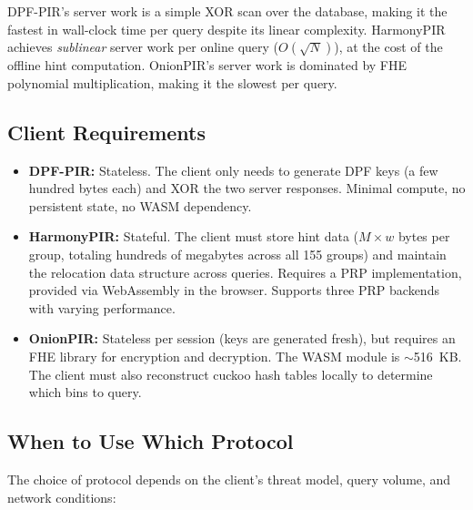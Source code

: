 DPF-PIR's server work is a simple XOR scan over the database, making it the fastest in wall-clock time per query despite its linear complexity. HarmonyPIR achieves \emph{sublinear} server work per online query ($O(\sqrt{N})$), at the cost of the offline hint computation. OnionPIR's server work is dominated by FHE polynomial multiplication, making it the slowest per query.

\subsection{Client Requirements}

\begin{itemize}[nolistsep,leftmargin=*]
    \item \textbf{DPF-PIR:} Stateless. The client only needs to generate DPF keys (a few hundred bytes each) and XOR the two server responses. Minimal compute, no persistent state, no WASM dependency.

    \item \textbf{HarmonyPIR:} Stateful. The client must store hint data ($M \times w$ bytes per group, totaling hundreds of megabytes across all 155 groups) and maintain the relocation data structure across queries. Requires a PRP implementation, provided via WebAssembly in the browser. Supports three PRP backends with varying performance.

    \item \textbf{OnionPIR:} Stateless per session (keys are generated fresh), but requires an FHE library for encryption and decryption. The WASM module is $\sim$516~KB. The client must also reconstruct cuckoo hash tables locally to determine which bins to query.
\end{itemize}

\subsection{When to Use Which Protocol}

The choice of protocol depends on the client's threat model, query volume, and network conditions:

